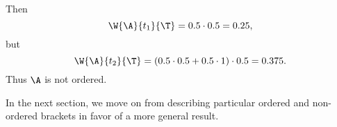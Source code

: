 {{    Then
    $$\W{\A}{t_1}{\T} = 0.5 \cdot 0.5 = 0.25,$$
    but
    $$\W{\A}{t_2}{\T} = (0.5 \cdot 0.5 + 0.5 \cdot 1) \cdot 0.5 = 0.375.$$
    Thus $\A$ is not ordered.
}{}

In the next section, we move on from describing particular ordered and non-ordered brackets in favor of a more general result.
}